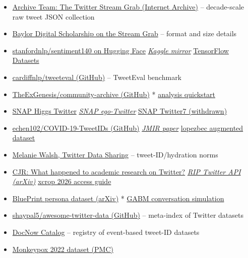 \documentclass[twocolumn,10pt,letterpaper]{article}
\begin{document}
\begin{itemize}
\setlength{\itemsep}{0pt}
\setlength{\parskip}{0pt}
  \item \href{https://archive.org/details/twitterstream}{Archive Team: The Twitter Stream Grab (Internet Archive)} -- decade-scale raw tweet JSON collection
  \item \href{https://blogs.baylor.edu/digitalscholarship/2018/11/02/archive-team-the-twitter-stream-grab-historic-twitter-content/}{Baylor Digital Scholarship on the Stream Grab} -- format and size details
  \item \href{https://huggingface.co/datasets/stanfordnlp/sentiment140}{stanfordnlp/sentiment140 on Hugging Face} \textit{ \href{https://www.kaggle.com/datasets/kazanova/sentiment140}{Kaggle mirror} } \href{https://www.tensorflow.org/datasets/catalog/sentiment140}{TensorFlow Datasets}
  \item \href{https://github.com/cardiffnlp/tweeteval}{cardiffnlp/tweeteval (GitHub)} -- TweetEval benchmark
  \item \href{https://github.com/TheExGenesis/community-archive}{TheExGenesis/community-archive (GitHub)} * \href{https://github.com/DefenderOfBasic/twitter-archive-toolkit/blob/main/Community\_Archive\_Analysis\_Quickstart.ipynb}{analysis quickstart}
  \item \href{https://snap.stanford.edu/data/higgs-twitter.html}{SNAP Higgs Twitter} \textit{ \href{https://snap.stanford.edu/data/ego-Twitter.html}{SNAP ego-Twitter} } \href{https://snap.stanford.edu/data/twitter7.html}{SNAP Twitter7 (withdrawn)}
  \item \href{https://github.com/echen102/COVID-19-TweetIDs}{echen102/COVID-19-TweetIDs (GitHub)} \textit{ \href{https://publichealth.jmir.org/2020/2/e19273/}{JMIR paper} } \href{https://github.com/lopezbec/COVID19\_Tweets\_Dataset}{lopezbec augmented dataset}
  \item \href{https://melaniewalsh.github.io/Intro-Cultural-Analytics/04-Data-Collection/13-Twitter-Data-Sharing.html}{Melanie Walsh, Twitter Data Sharing} -- tweet-ID/hydration norms
  \item \href{https://www.cjr.org/tow\_center/qa-what-happened-to-academic-research-on-twitter.php}{CJR: What happened to academic research on Twitter?} \textit{ \href{https://arxiv.org/pdf/2404.07340}{RIP Twitter API (arXiv)} } \href{https://xcrop.io/blog/twitter-data-academic-research}{xcrop 2026 access guide}
  \item \href{https://arxiv.org/pdf/2510.02343}{BluePrint persona dataset (arXiv)} * \href{https://www.researchgate.net/publication/397507280\_Simulating\_conversations\_on\_social\_media\_with\_generative\_agent-based\_models}{GABM conversation simulation}
  \item \href{https://github.com/shaypal5/awesome-twitter-data}{shaypal5/awesome-twitter-data (GitHub)} -- meta-index of Twitter datasets
  \item \href{https://catalog.docnow.io/}{DocNow Catalog} -- registry of event-based tweet-ID datasets
  \item \href{https://www.ncbi.nlm.nih.gov/pmc/articles/PMC9680479/}{Monkeypox 2022 dataset (PMC)}
\end{itemize}


\balance
\end{document}
